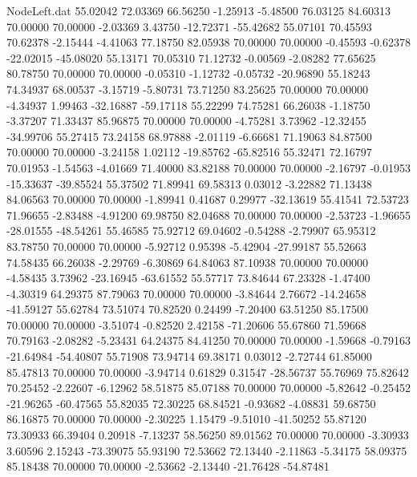 \begin{filecontents}{NodeLeft.dat}
  55.02042   72.03369   66.56250    -1.25913   -5.48500   76.03125   84.60313   70.00000   70.00000   -2.03369    3.43750  -12.72371  -55.42682
  55.07101   70.45593   70.62378    -2.15444   -4.41063   77.18750   82.05938   70.00000   70.00000   -0.45593   -0.62378  -22.02015  -45.08020
  55.13171   70.05310   71.12732    -0.00569   -2.08282   77.65625   80.78750   70.00000   70.00000   -0.05310   -1.12732   -0.05732  -20.96890
  55.18243   74.34937   68.00537    -3.15719   -5.80731   73.71250   83.25625   70.00000   70.00000   -4.34937    1.99463  -32.16887  -59.17118
  55.22299   74.75281   66.26038    -1.18750   -3.37207   71.33437   85.96875   70.00000   70.00000   -4.75281    3.73962  -12.32455  -34.99706
  55.27415   73.24158   68.97888    -2.01119   -6.66681   71.19063   84.87500   70.00000   70.00000   -3.24158    1.02112  -19.85762  -65.82516
  55.32471   72.16797   70.01953    -1.54563   -4.01669   71.40000   83.82188   70.00000   70.00000   -2.16797   -0.01953  -15.33637  -39.85524
  55.37502   71.89941   69.58313     0.03012   -3.22882   71.13438   84.06563   70.00000   70.00000   -1.89941    0.41687    0.29977  -32.13619
  55.41541   72.53723   71.96655    -2.83488   -4.91200   69.98750   82.04688   70.00000   70.00000   -2.53723   -1.96655  -28.01555  -48.54261
  55.46585   75.92712   69.04602    -0.54288   -2.79907   65.95312   83.78750   70.00000   70.00000   -5.92712    0.95398   -5.42904  -27.99187
  55.52663   74.58435   66.26038    -2.29769   -6.30869   64.84063   87.10938   70.00000   70.00000   -4.58435    3.73962  -23.16945  -63.61552
  55.57717   73.84644   67.23328    -1.47400   -4.30319   64.29375   87.79063   70.00000   70.00000   -3.84644    2.76672  -14.24658  -41.59127
  55.62784   73.51074   70.82520     0.24499   -7.20400   63.51250   85.17500   70.00000   70.00000   -3.51074   -0.82520    2.42158  -71.20606
  55.67860   71.59668   70.79163    -2.08282   -5.23431   64.24375   84.41250   70.00000   70.00000   -1.59668   -0.79163  -21.64984  -54.40807
  55.71908   73.94714   69.38171     0.03012   -2.72744   61.85000   85.47813   70.00000   70.00000   -3.94714    0.61829    0.31547  -28.56737
  55.76969   75.82642   70.25452    -2.22607   -6.12962   58.51875   85.07188   70.00000   70.00000   -5.82642   -0.25452  -21.96265  -60.47565
  55.82035   72.30225   68.84521    -0.93682   -4.08831   59.68750   86.16875   70.00000   70.00000   -2.30225    1.15479   -9.51010  -41.50252
  55.87120   73.30933   66.39404     0.20918   -7.13237   58.56250   89.01562   70.00000   70.00000   -3.30933    3.60596    2.15243  -73.39075
  55.93190   72.53662   72.13440    -2.11863   -5.34175   58.09375   85.18438   70.00000   70.00000   -2.53662   -2.13440  -21.76428  -54.87481

\end{filecontents}
